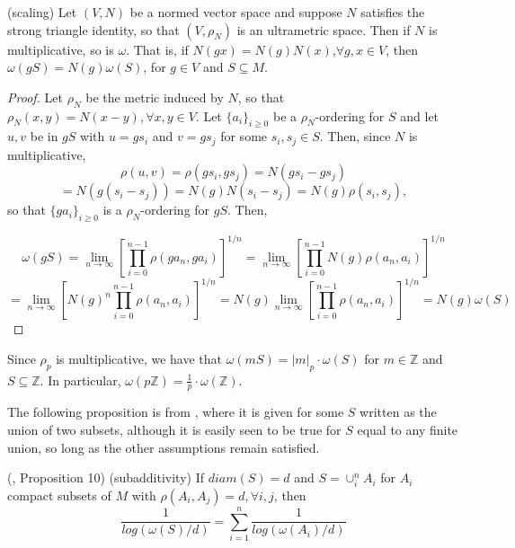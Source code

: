 \begin{proposition}
(scaling)	Let $(V, N)$ be a normed vector space and suppose $N$ satisfies the strong triangle identity, so that $(V,\rho_N)$ is an ultrametric space. Then if $N$ is multiplicative, so is $\omega$. That is, if $N(gx)=N(g)N(x)$,$\forall g,x \in V$, then $\omega(gS) = N(g)  \omega(S)$, for $g \in V$ and $S \subseteq M$. 
\end{proposition}

\begin{proof}
	Let $\rho_N$ be the metric induced by $N$, so that $\rho_N(x,y) = N(x-y), \forall x,y \in V$. Let $\{a_i\}_{i\geq 0}$ be a $\rho_N$-ordering for $S$ and let $u, v$ be in $gS$ with $u=gs_i$ and $v=gs_j$ for some $s_i, s_j \in S$. Then, since $N$ is multiplicative, \[\rho(u, v) = \rho(gs_i, gs_j) =N(gs_i - gs_j)\] 
	\[ = N(g(s_i - s_j)) = N(g)N(s_i - s_j) = N(g)\rho(s_i,s_j),\]
	so that $\{ga_i\}_{i\geq 0}$ is a $\rho_N$-ordering for $gS$. Then,
	
	$$\omega(gS) = \lim_{n\to\infty} [\prod_{i=0}^{n-1} \rho(ga_n,ga_i)]^{1/n} 
	= \lim_{n\to\infty} [\prod_{i=0}^{n-1} N(g)\rho(a_n,a_i)]^{1/n} $$
	$$= \lim_{n\to\infty} [N(g)^n\prod_{i=0}^{n-1} \rho(a_n,a_i)]^{1/n} = N(g) \lim_{n\to\infty} [\prod_{i=0}^{n-1} \rho(a_n,a_i)]^{1/n} = N(g) \omega(S)$$
\end{proof}


\begin{example}
	Since $\rho_p$ is multiplicative, we have that $\omega(mS) = \lvert m \rvert_p\cdot \omega(S)$ for $m \in \mathbb{Z}$ and $S \subseteq \mathbb{Z}$. In particular, $\omega(p\mathbb{Z}) = \frac{1}{p}\cdot \omega(\mathbb{Z})$. %
\end{example}

The following proposition is from \cite{kj}, where it is given for some $S$  written as the union of two subsets, although it is easily seen to be true for $S$ equal to any finite union, so long as the other assumptions remain satisfied.  

\begin{proposition}
	(\cite{kj}, Proposition 10) (subadditivity) If  $diam(S)=d$ and $S=\cup_i^n A_i$ for $A_i$ compact subsets of $M$ with $\rho(A_i, A_j)=d, \forall i,j$, then \[\frac{1}{log(\omega(S)/d) } = \sum_{i=1}^n \frac{1}{log(\omega(A_i)/d)}\] 
\end{proposition}


